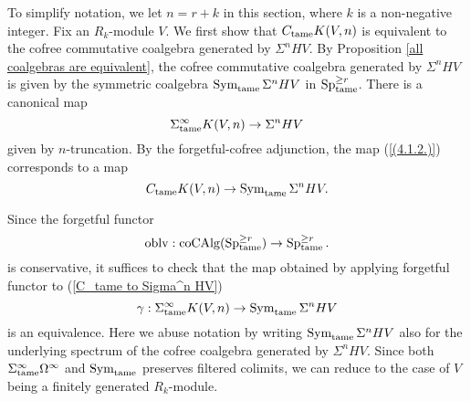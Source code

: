 
To simplify notation, we let $n=r+k$ in this section, where $k$ is a non-negative integer. 
Fix an  $R_{k}$-module $V$.
We first show that $C_{\operatorname{\operatorname{tame}}}K(V, n)$ is equivalent to the cofree commutative coalgebra generated by $\Sigma^{n}HV$.
By Proposition \ref{all coalgebras are equivalent}, the cofree commutative coalgebra generated by $\Sigma^{n}HV$ is given by the symmetric coalgebra 
$\operatorname{Sym}_{\operatorname{\operatorname{tame}}} \Sigma^{n}HV$ in $\operatorname{Sp}^{\geq r}_{\operatorname{\operatorname{tame}}}$.
There is a canonical map 
\begin{equation}
\label{(4.1.2.)}
    \Sigma_{\operatorname{\operatorname{tame}}}^{\infty}K(V,n)\to  \Sigma^{n}HV
\end{equation}
given by $n$-truncation. By the forgetful-cofree adjunction, the map (\ref{(4.1.2.)}) corresponds to a map
\begin{equation}
\label{C_tame to Sigma^n HV}
    C_{\operatorname{\operatorname{tame}}}K(V,n)\to \operatorname{Sym}_{\operatorname{\operatorname{tame}}} \Sigma^{n}HV.
\end{equation}

Since the forgetful functor 
$$
\operatorname{oblv}: \operatorname{coCAlg}(\operatorname{Sp}^{\geq r}_{\operatorname{\operatorname{tame}}}) \to 
\operatorname{Sp}^{\geq r}_{\operatorname{\operatorname{tame}}}.
$$
is conservative, it suffices to check that the map obtained by applying forgetful functor to (\ref{C_tame to Sigma^n HV})
\begin{equation}
\label{(4.1.1.)}
\gamma:  \Sigma^{\infty}_{\operatorname{\operatorname{tame}}}K(V,n)\to \operatorname{Sym}_{\operatorname{\operatorname{tame}}} \Sigma^{n}HV
\end{equation}
is an equivalence. Here we abuse notation by writing $\operatorname{Sym}_{\operatorname{\operatorname{tame}}} \Sigma^{n}HV$ also for the underlying spectrum of the cofree coalgebra generated by $\Sigma^{n}HV$.
Since both $\Sigma^{\infty}_{\operatorname{\operatorname{tame}}}\Omega^{\infty}$ and $\operatorname{Sym}_{\operatorname{\operatorname{tame}}}$ preserves filtered colimits, we can reduce to the case of $V$ being a finitely generated $R_k$-module. 

